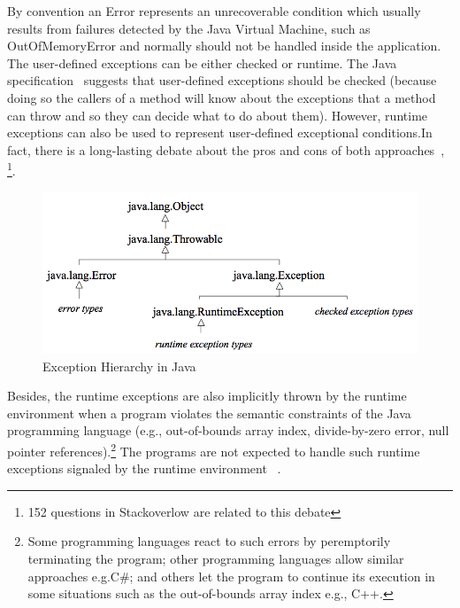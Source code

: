 \documentclass[conference]{IEEEtran}
\begin{document}
By convention an Error represents an unrecoverable condition which usually results
from failures detected by the Java Virtual Machine, such as OutOfMemoryError and
normally should not be handled inside the application. The user-defined exceptions 
can be either checked or runtime. The Java specification~\cite{gosling2000java} 
suggests that user-defined exceptions should be checked (because doing so 
the callers of a method will know about the exceptions that a method can throw and so 
they can decide what to do about them). However, runtime exceptions can also be 
used to represent user-defined exceptional conditions.In fact, there is a long-lasting debate 
about the pros and cons of both approaches~\cite{javatut,stackoverlow,debate},
\footnote{152 questions in Stackoverlow are related to this debate}.


\begin{figure} \centering \includegraphics[width=\hsize]{new2_hierarchy.png}
  \caption{Exception Hierarchy in Java} \label{fig:exchier} \end{figure}


Besides, the runtime exceptions are also implicitly thrown by the runtime environment when a program violates 
the semantic constraints of the Java programming language (e.g., out-of-bounds array index, divide-by-zero 
error, null pointer references).\footnote{Some programming languages react to such errors by peremptorily terminating the program; 
other programming languages allow similar approaches e.g.C\#; and others let the program to continue
 its execution in some situations such as the out-of-bounds array index e.g., C++. }  
The programs are not expected to handle such runtime exceptions signaled by the runtime environment ~\cite{gosling2000java}. 

\end{document}
